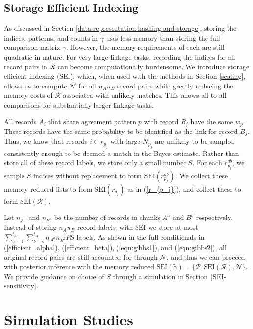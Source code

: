 \documentclass[ba]{imsart}
\begin{document}
\hypertarget{SEI}{%
	\subsection{Storage Efficient Indexing}\label{SEI}}

As discussed in Section \ref{data-representation-hashing-and-storage}, storing the indices, patterns, and counts in $\tilde{\gamma}$ uses less memory than storing the full comparison matrix $\gamma$. However, the memory requirements of each are still quadratic in nature. For very large linkage tasks, recording the indices for all record pairs in $\mathcal{R}$ can become computationally burdensome. We introduce storage efficient indexing (SEI), which, when used with the methods in Section \ref{scaling}, allows us to compute $\mathcal{N}$ for all $n_A n_B$ record pairs while greatly reducing the memory costs of $\mathcal{R}$ associated with unlikely matches. This allows all-to-all comparisons for substantially larger linkage tasks.

All records $A_i$ that share agreement pattern $p$ with record $B_j$ have the same $w_{p}$. These records have the same probability to be identified as the link for record $B_j$. Thus, we know that records $i \in r_{p_j}$ with large $N_{p_j}$ are unlikely to be sampled consistently enough to be deemed a match in the Bayes estimate. Rather than store all of these record labels, we store only a small number $S$. For each $r_{p_j}^{ab}$, we sample $S$ indices without replacement to form $\text{SEI}(r_{p_j}^{ab})$. We collect these memory reduced lists to form $\text{SEI}(r_{p_j})$ as in (\ref{r_{p_j}}), and collect these to form $\text{SEI}(\mathcal{R})$.

Let $n_{A^a}$ and $n_{B^b}$ be the number of records in chunks $A^a$ and $B^b$ respectively. Instead of storing $n_A n_B$ record labels, with SEI we store at most $\sum_{a = 1}^{t_A}\sum_{b = b}^{t_A} n_{A^a}  n_{B^b}  P  S$ labels. As shown in the full conditionals in (\ref{efficient_alpha}),  (\ref{efficient_beta}), (\ref{eqn:gibbs1}), and (\ref{eqn:gibbs2}), all original record pairs are still accounted for through $\mathcal{N}$, and thus we can proceed with posterior inference with the memory reduced $\text{SEI}(\tilde{\gamma}) = \{\mathcal{P}, \text{SEI}(\mathcal{R}), \mathcal{N}\}$. We provide guidance on choice of $S$ through a simulation in Section~\ref{SEI-sensitivity}.

	\section{Simulation Studies}
	\label{sec:simulations}
	
\end{document}
